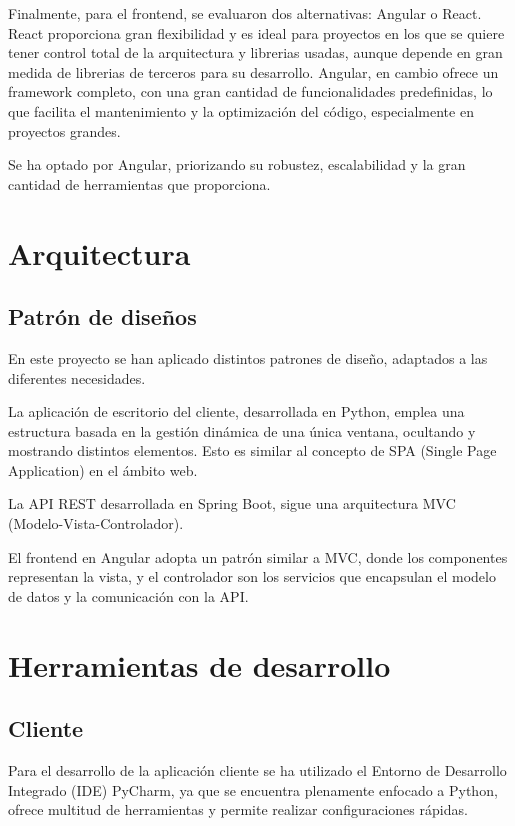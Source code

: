 Finalmente, para el frontend, se evaluaron dos alternativas: Angular o React.
React proporciona gran flexibilidad y es ideal para proyectos en los que se quiere tener control total de la arquitectura
y librerias usadas, aunque depende en gran medida de librerias de terceros para su desarrollo.
Angular, en cambio ofrece un framework completo, con una gran cantidad de funcionalidades predefinidas, lo que facilita
el mantenimiento y la optimización del código, especialmente en proyectos grandes.

Se ha optado por Angular\cite{angular:docs}, priorizando su robustez, escalabilidad y la gran cantidad de herramientas que proporciona.

\section{Arquitectura}\label{sec:arquitectura}

\subsection{Patrón de diseños}\label{subsec:patron}

En este proyecto se han aplicado distintos patrones de diseño, adaptados a las diferentes necesidades.

La aplicación de escritorio del cliente, desarrollada en Python, emplea una estructura basada en la gestión dinámica
de una única ventana, ocultando y mostrando distintos elementos.
Esto es similar al concepto de SPA (Single Page Application) en el ámbito web.

La API REST desarrollada en Spring Boot, sigue una arquitectura MVC (Modelo-Vista-Controlador)\cite{wikipedia:mvc}.

El frontend en Angular adopta un patrón similar a MVC, donde los componentes representan la vista, y el controlador
son los servicios que encapsulan el modelo de datos y la comunicación con la API.

\section{Herramientas de desarrollo}\label{sec:desarrollo}

\subsection{Cliente}\label{subsec:desarrollo_cliente}

Para el desarrollo de la aplicación cliente se ha utilizado el Entorno de Desarrollo Integrado (IDE) PyCharm\cite{pycharm:official},
ya que se encuentra plenamente enfocado a Python, ofrece multitud de herramientas y permite realizar configuraciones rápidas.

